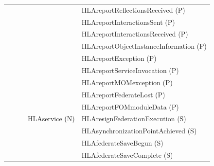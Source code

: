 \begin{compactstdpage}
\begin{momtabletypeset}[8.00]
{{\begin{tabular}{|Y{76.87pt}|Y{60.44pt}|Y{67.64pt}|Y{54.56pt}|Y{156.97pt}|}
                    &                &                 &                        & HLAreportReflectionsReceived (P)                      \\
                    &                &                 &                        & HLAreportInteractionsSent (P)                         \\
                    &                &                 &                        & HLAreportInteractionsReceived (P)                     \\
                    &                &                 &                        & HLAreportObjectInstanceInformation (P)                \\
                    &                &                 &                        & HLAreportException (P)                                \\
                    &                &                 &                        & HLAreportServiceInvocation (P)                        \\
                    &                &                 &                        & HLAreportMOMexception (P)                             \\
                    &                &                 &                        & HLAreportFederateLost (P)                             \\
                    &                &                 &                        & HLAreportFOMmoduleData (P)                            \\
                    &                &                 & HLAservice (N)         & HLAresignFederationExecution (S)                      \\
                    &                &                 &                        & HLAsynchronizationPointAchieved (S)                   \\
                    &                &                 &                        & HLAfederateSaveBegun (S)                              \\
                    &                &                 &                        & HLAfederateSaveComplete (S)                           \\

\end{tabular}}}
\end{momtabletypeset}
\end{compactstdpage}
